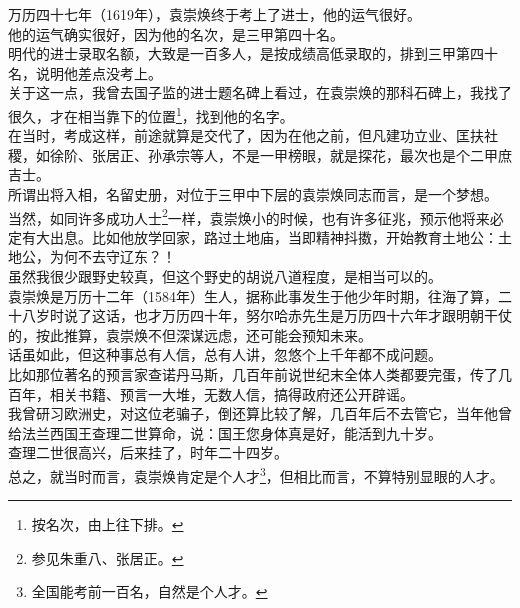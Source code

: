 \begin{multicols}{\theparacolNo}
万历四十七年（1619年），袁崇焕终于考上了进士，他的运气很好。\\

他的运气确实很好，因为他的名次，是三甲第四十名。\\

明代的进士录取名额，大致是一百多人，是按成绩高低录取的，排到三甲第四十名，说明他差点没考上。\\

关于这一点，我曾去国子监的进士题名碑上看过，在袁崇焕的那科石碑上，我找了很久，才在相当靠下的位置\footnote{按名次，由上往下排。}，找到他的名字。\\

在当时，考成这样，前途就算是交代了，因为在他之前，但凡建功立业、匡扶社稷，如徐阶、张居正、孙承宗等人，不是一甲榜眼，就是探花，最次也是个二甲庶吉士。\\

所谓出将入相，名留史册，对位于三甲中下层的袁崇焕同志而言，是一个梦想。\\

当然，如同许多成功人士\footnote{参见朱重八、张居正。}一样，袁崇焕小的时候，也有许多征兆，预示他将来必定有大出息。比如他放学回家，路过土地庙，当即精神抖擞，开始教育土地公：土地公，为何不去守辽东？！\\

虽然我很少跟野史较真，但这个野史的胡说八道程度，是相当可以的。\\

袁崇焕是万历十二年（1584年）生人，据称此事发生于他少年时期，往海了算，二十八岁时说了这话，也才万历四十年，努尔哈赤先生是万历四十六年才跟明朝干仗的，按此推算，袁崇焕不但深谋远虑，还可能会预知未来。\\

话虽如此，但这种事总有人信，总有人讲，忽悠个上千年都不成问题。\\

比如那位著名的预言家查诺丹马斯，几百年前说世纪末全体人类都要完蛋，传了几百年，相关书籍、预言一大堆，无数人信，搞得政府还公开辟谣。\\

我曾研习欧洲史，对这位老骗子，倒还算比较了解，几百年后不去管它，当年他曾给法兰西国王查理二世算命，说：国王您身体真是好，能活到九十岁。\\

查理二世很高兴，后来挂了，时年二十四岁。\\

总之，就当时而言，袁崇焕肯定是个人才\footnote{全国能考前一百名，自然是个人才。}，但相比而言，不算特别显眼的人才。\\


\end{multicols}
